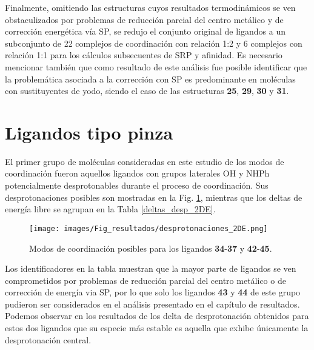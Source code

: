 Finalmente, omitiendo las estructuras cuyos resultados termodinámicos se ven obstaculizados por problemas de reducción parcial del centro metálico y de corrección energética vía SP, se redujo el conjunto original de ligandos a un subconjunto de 22 complejos de coordinación con relación 1:2 y 6 complejos con relación 1:1 para los cálculos subsecuentes de SRP y afinidad. Es necesario mencionar también que como resultado de este análisis fue posible identificar que la problemática asociada a la corrección con SP es predominante en moléculas con sustituyentes de yodo, siendo el caso de las estructuras \textbf{25}, \textbf{29}, \textbf{30} y \textbf{31}.

\section{Ligandos tipo pinza}

El primer grupo de moléculas consideradas en este estudio de los modos de coordinación fueron aquellos ligandos con grupos laterales OH y NHPh potencialmente desprotonables durante el proceso de coordinación. Sus desprotonaciones posibles son mostradas en la Fig. \ref{desprotonaciones_2DE}, mientras que los deltas de energía libre se agrupan en la Tabla \ref{deltas_desp_2DE}.\\ 
\begin{figure}[ht] 
\centering
\texttt{[image: images/Fig\_resultados/desprotonaciones\_2DE.png]}
\caption{Modos de coordinación posibles para los ligandos \textbf{34}-\textbf{37} y \textbf{42}-\textbf{45}.}\label{desprotonaciones_2DE}
\end{figure}

Los identificadores en la tabla muestran que la mayor parte de ligandos se ven comprometidos por problemas de reducción parcial del centro metálico o de corrección de energía via SP, por lo que solo los ligandos \textbf{43} y \textbf{44} de este grupo pudieron ser considerados en el análisis presentado en el capítulo de resultados. Podemos observar en los resultados de los delta de desprotonación obtenidos para estos dos ligandos que su especie más estable es aquella que exhibe únicamente la desprotonación central.

\clearpage

